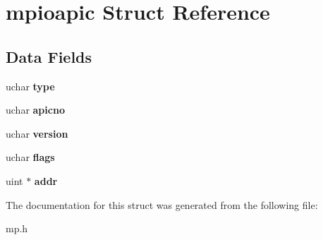 \hypertarget{structmpioapic}{}\section{mpioapic Struct Reference}
\label{structmpioapic}
\subsection*{Data Fields}
\begin{DoxyCompactItemize}
\item 
uchar {\bfseries type}\hypertarget{structmpioapic_a8d7527bad798d6f8a59a21df06879f0f}{}\label{structmpioapic_a8d7527bad798d6f8a59a21df06879f0f}

\item 
uchar {\bfseries apicno}\hypertarget{structmpioapic_a9a975b41f6af43937d67c3b63235dd7d}{}\label{structmpioapic_a9a975b41f6af43937d67c3b63235dd7d}

\item 
uchar {\bfseries version}\hypertarget{structmpioapic_a7c6f3d950f89e2b982fd53f7c59681e7}{}\label{structmpioapic_a7c6f3d950f89e2b982fd53f7c59681e7}

\item 
uchar {\bfseries flags}\hypertarget{structmpioapic_a9cc0f4c76312b7d074c558cbcad38a12}{}\label{structmpioapic_a9cc0f4c76312b7d074c558cbcad38a12}

\item 
uint $\ast$ {\bfseries addr}\hypertarget{structmpioapic_a364bbba1df7846f9c6d271c7c85a7aaa}{}\label{structmpioapic_a364bbba1df7846f9c6d271c7c85a7aaa}

\end{DoxyCompactItemize}


The documentation for this struct was generated from the following file\+:\begin{DoxyCompactItemize}
\item 
mp.\+h\end{DoxyCompactItemize}
